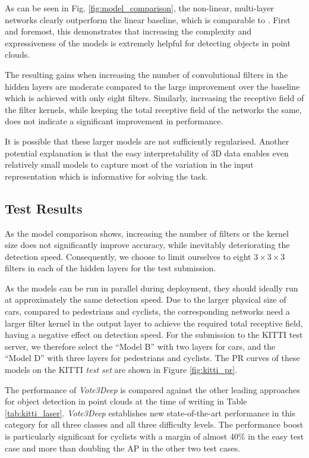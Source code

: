 \documentclass[letterpaper, 10 pt, conference]{tex_style/ieeeconf}
\begin{document}
As can be seen in Fig. \ref{fig:model_comparison}, the non-linear, multi-layer networks clearly outperform the linear baseline, which is comparable to \cite{wang2015voting}.
First and foremost, this demonstrates that increasing the complexity and expressiveness of the models is extremely helpful for detecting objects in point clouds.

The resulting gains when increasing the number of convolutional filters in the hidden layers are moderate compared to the large improvement over the baseline which is achieved with only eight filters.
Similarly, increasing the receptive field of the filter kernels, while keeping the total receptive field of the networks the same, does not indicate a significant improvement in performance.

It is possible that these larger models are not sufficiently regularised.
Another potential explanation is that the easy interpretability of 3D data enables even relatively small models to capture most of the variation in the input representation which is informative for solving the task.



\subsection{Test Results}
\label{sec:test_results}

As the model comparison shows, increasing the number of filters or the kernel size does not significantly improve accuracy, while inevitably deteriorating the detection speed.
Consequently, we choose to limit ourselves to eight $3\times3\times3$ filters in each of the hidden layers for the test submission.

As the models can be run in parallel during deployment, they should ideally run at approximately the same detection speed.
Due to the larger physical size of cars, compared to pedestrians and cyclists, the corresponding networks need a larger filter kernel in the output layer to achieve the required total receptive field, having a negative effect on detection speed.
For the submission to the KITTI test server, we therefore select the ``Model B'' with two layers for cars, and the ``Model D'' with three layers for pedestrians and cyclists.
The PR curves of these models on the KITTI \emph{test set} are shown in Figure \ref{fig:kitti_pr}.

The performance of \emph{Vote3Deep} is compared against the other leading approaches for object detection in point clouds at the time of writing in Table \ref{tab:kitti_laser}.
\emph{Vote3Deep} establishes new state-of-the-art performance in this category for all three classes and all three difficulty levels.
The performance boost is particularly significant for cyclists with a margin of almost 40\% in the easy test case and more than doubling the AP in the other two test cases.
\end{document}
